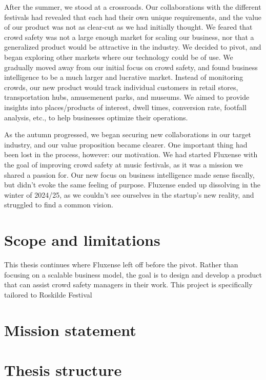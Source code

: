 After the summer, we stood at a crossroads. Our collaborations with the different festivals had revealed that each had their own unique requirements, and the value of our product was not as clear-cut as we had initially thought. We feared that crowd safety was not a large enough market for scaling our business, nor that a generalized product would be attractive in the industry. We decided to pivot, and began exploring other markets where our technology could be of use. We gradually moved away from our initial focus on crowd safety, and found business intelligence to be a much larger and lucrative market. Instead of monitoring crowds, our new product would track individual customers in retail stores, transportation hubs, amusemenent parks, and museums. We aimed to provide insights into places/products of interest, dwell times, conversion rate, footfall analysis, etc., to help businesses optimize their operations.

As the autumn progressed, we began securing new collaborations in our target industry, and our value proposition became clearer. One important thing had been lost in the process, however: our motivation. We had started Fluxense with the goal of improving crowd safety at music festivals, as it was a mission we shared a passion for. Our new focus on business intelligence made sense fiscally, but didn't evoke the same feeling of purpose. Fluxense ended up dissolving in the winter of 2024/25, as we couldn't see ourselves in the startup's new reality, and struggled to find a common vision.

\section{Scope and limitations}

This thesis continues where Fluxense left off before the pivot. Rather than focusing on a scalable business model, the goal is to design and develop a product that can assist crowd safety managers in their work. This project is specifically tailored to Roskilde Festival

\section{Mission statement}

\section{Thesis structure}

